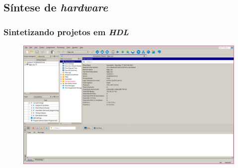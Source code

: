 \documentclass[aspectratio=169]{beamer}
\begin{document}
    \subsection{Síntese de \textit{hardware}}
    \begin{frame}
        \frametitle{Sintetizando projetos em \textit{HDL}}
        \begin{figure}[H]
        \centering
            \includegraphics[width=.9\textwidth,height=.8\textheight,keepaspectratio]
            {../images/quartus/quartus.png}
        \end{figure}
        \vfill
    \end{frame}
\end{document}
